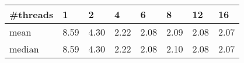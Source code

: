 \begin{tabu}{l|XXXXXXX}
\#threads&1 &2 &4 &6 &8 &12 &16 \\
\hline
mean &8.59 &4.30 &2.22 &2.08 &2.09 &2.08 &2.07 \\
median &8.59 &4.30 &2.22 &2.08 &2.10 &2.08 &2.07 \\
\end{tabu}

